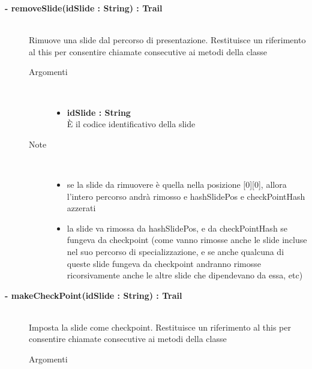 \begin{description}
	\begin{description}
		\item[\textbf{\color{blue}- removeSlide(idSlide : String) : Trail			}] \hfill \\
			Rimuove una slide dal percorso di presentazione. Restituisce un riferimento al this per consentire chiamate consecutive ai metodi della classe
			
		\begin{description}
			\item[Argomenti] \hfill \\
				\begin{itemize}
					\item \textbf{idSlide : String		} \hfill \\
					È il codice identificativo della slide 
					
				\end{itemize}
			\item[Note] \hfill \\	
				\begin{itemize}
					\item se la slide da rimuovere è quella nella posizione [0][0], allora l'intero percorso andrà rimosso e hashSlidePos e checkPointHash azzerati
					\item la slide va rimossa da hashSlidePos, e da checkPointHash se fungeva da checkpoint (come vanno rimosse anche le slide incluse nel suo percorso di specializzazione, e se anche qualcuna di queste slide fungeva da checkpoint andranno rimosse ricorsivamente anche le altre slide che dipendevano da essa, etc)
				\end{itemize}
		\end{description}
	\end{description}
	
	\begin{description}
		\item[\textbf{\color{blue}- makeCheckPoint(idSlide : String) : Trail			}] \hfill \\
			Imposta la slide come checkpoint. Restituisce un riferimento al this per consentire chiamate consecutive ai metodi della classe
			
		\begin{description}
			\item[Argomenti] \hfill \\
				\begin{itemize}
				

\end{itemize}
\end{description}
\end{description}
\end{description}
